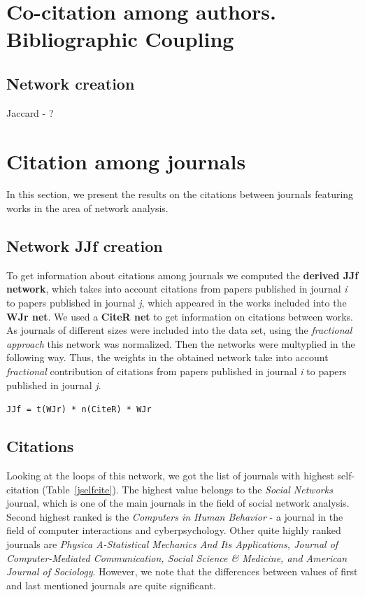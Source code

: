 \documentclass[11pt]{article} %
\newcommand{\Remark}[1]{\ifodd\value{page} \normalmarginpar
 \else \reversemarginpar \fi \marginpar{{\footnotesize #1}} }
\begin{document}
\section{Co-citation among authors. Bibliographic Coupling }

\subsection{Network creation} 

Jaccard - ? \Remark{Try to compute}

\section{Citation among journals}

In this section, we present the results on the citations between journals featuring works in the area of network analysis. 

\subsection{Network JJf creation}

To get information about citations among journals we computed the \textbf{derived JJf network}, which takes into account citations from papers published in journal \textit{i} to papers published in journal \textit{j}, which appeared in the works included into the \textbf{WJr net}. We used a \textbf{CiteR net} to get information on citations between works. As journals of different sizes were included into the data set, using the \textit{fractional approach} this network was normalized. Then the networks were multyplied in the following way. Thus, the weights in the obtained network take into account \textit{fractional} contribution of citations from papers published in journal \textit{i} to papers published in journal \textit{j}.   \medskip 

\texttt{JJf = t(WJr) * n(CiteR) * WJr}

\subsection{Citations}

Looking at the loops of this network, we got the list of journals with highest self-citation (Table~\ref{jselfcite}). The highest value belongs to the \textit{Social Networks} journal, which is one of the main journals in the field of social network analysis. Second highest ranked is the \textit{Computers in Human Behavior} - a journal in the field of computer interactions and cyberpsychology. Other quite highly ranked journals are \textit{Physica A-Statistical Mechanics And Its Applications, Journal of Computer-Mediated Communication, Social Science \& Medicine, and American Journal of Sociology}. However, we note that the differences between values of first and last mentioned journals are quite significant. \medskip 
\end{document}
